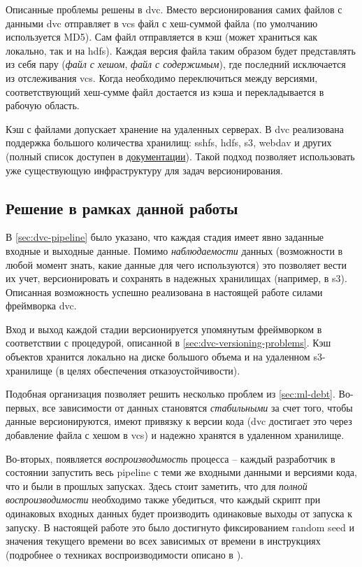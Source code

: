 Описанные проблемы решены в \gls{dvc}.
Вместо версионирования самих файлов с данными \gls{dvc} отправляет в \acrshort{vcs} файл с хеш-суммой файла (по умолчанию используется MD5).
Сам файл отправляется в кэш (может храниться как локально, так и на \gls{hdfs}).
Каждая версия файла таким образом будет представлять из себя пару (\textit{файл с хешом}, \textit{файл с содержимым}), где последний исключается из отслеживания \gls{vcs}.
Когда необходимо переключиться между версиями, соответствующий хеш-сумме файл достается из кэша и перекладывается в рабочую область.

Кэш с файлами допускает хранение на удаленных серверах.
В \gls{dvc} реализована поддержка большого количества хранилищ: \acrshort{sshfs}, \gls{hdfs}, \gls{s3}, \gls{webdav} и других (полный список доступен в \href{https://dvc.org/doc/command-reference/remote/add#supported-storage-types}{документации}).
Такой подход позволяет использовать уже существующую инфраструктуру для задач версионирования.

\subsection{Решение в рамках данной работы}
В \ref{sec:dvc-pipeline} было указано, что каждая стадия имеет явно заданные входные и выходные данные.
Помимо \textit{наблюдаемости} данных (возможности в любой момент знать, какие данные для чего используются) это позволяет вести их учет, версионировать и сохранять в надежных хранилищах (например, в \gls{s3}).
Описанная возможность успешно реализована в настоящей работе силами фреймворка \gls{dvc}.

Вход и выход каждой стадии версионируется упомянутым фреймворком в соответствии с процедурой, описанной в \ref{sec:dvc-versioning-problems}.
Кэш объектов хранится локально на диске большого объема и на удаленном \gls{s3}-хранилище (в целях обеспечения отказоустойчивости).

Подобная организация позволяет решить несколько проблем из \ref{sec:ml-debt}.
Во-первых, все зависимости от данных становятся \textit{стабильными} за счет того, чтобы данные версионируются, имеют привязку к версии кода (\gls{dvc} достигает это через добавление файла с хешом в \gls{vcs}) и надежно хранятся в удаленном хранилище.

Во-вторых, появляется \textit{воспроизводимость} процесса -- каждый разработчик в состоянии запустить весь \gls{pipeline} с теми же входными данными и версиями кода, что и были в прошлых запусках.
Здесь стоит заметить, что для \textit{полной воспроизводимости} необходимо также убедиться, что каждый скрипт при одинаковых входных данных будет производить одинаковые выходы от запуска к запуску.
В настоящей работе это было достигнуто фиксированием random seed и значения текущего времени во всех зависимых от времени в инструкциях (подробнее о техниках воспроизводимости описано в \cite{cite:ml-reproducibility}).

